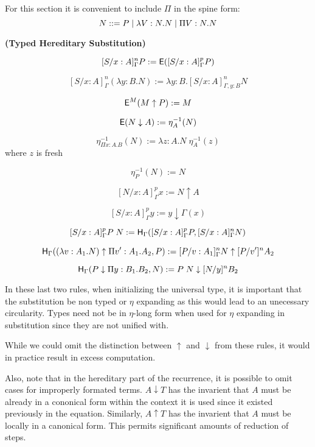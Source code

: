 For this section it is convenient to include $\Pi$ in the spine form: 
\[
N ::= P 
\; | \; \lambda V : N . N 
\; | \; \Pi V : N . N 
\]


\begin{definition}
\textbf{(Typed Hereditary Substitution)}

\[
[S / x : A]^n_{\Gamma } P := \mathsf{E}([S / x : A]^p_{\Gamma } P)
\]

\[
[S / x : A]^n_{\Gamma } (\lambda y : B . N) := \lambda y:B . [S / x : A]^n_{\Gamma, y : B} N
\]

\[
\mathsf{E}^M(M \uparrow P) := M
\]

\[
\mathsf{E}(N \downarrow A) := \eta^{-1}_A (N)
\]

\[
\eta^{-1}_{\Pi x : A . B}(N) := \lambda z : A . N \; \eta^{-1}_A(z)
\] where $z$ is fresh

\[
\eta^{-1}_{P}(N) := N
\]

\[ 
[ N / x : A]^p_{\Gamma} x := N \uparrow A
\]

\[
[S / x : A]^p_{\Gamma} y := y \downarrow \Gamma(x)
\] 

\[
[S / x : A]^p_{\Gamma } P\;N := 
\mathsf{H}_{\Gamma} ( [S/x : A]^p_{\Gamma} P , [S/x : A]^n_{\Gamma} N) 
\]

\[
\mathsf{H}_{\Gamma} ((\lambda v : A_1 . N) \uparrow \Pi v' : A_1 . A_2 , P) 
:= [P/v : A_1]^n_{\Gamma} N \uparrow [P/v']^n A_2
\]

\[
\mathsf{H}_{\Gamma}(P \downarrow \Pi y : B_1 . B_2 , N) := P\; N \downarrow [N/y]^nB_2
\]

\label{def:tyhered}
\end{definition} 

In these last two rules, when initializing the universal type, it is important that the substitution be non typed
or $\eta$ expanding as this would lead to an unecessary circularity.  Types need not be in $\eta$-long form
when used for $\eta$ expanding in substitution since they are not unified with.

While we could omit the distinction between $\uparrow$ and $\downarrow$ from
these rules, it would in practice result in excess computation.

Also, note that in the hereditary part of the recurrence, 
it is possible to omit cases for improperly formated terms.  $A \downarrow T$ has the invarient that
$A$ must be already in a cononical form within the context it is used since it existed previously in the
equation.  Similarly, $A \uparrow T$ has the invarient that $A$ must be locally in a canonical form.
This permits significant amounts of reduction of steps.

